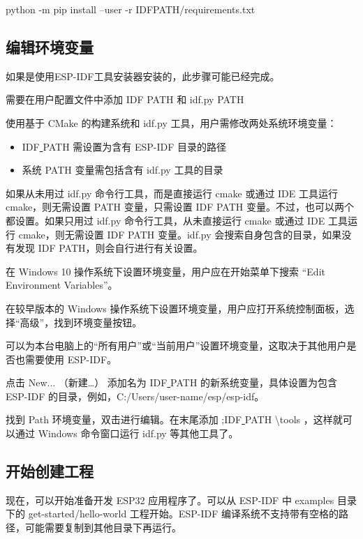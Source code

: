 \begin{tcolorbox}
    python -m pip install --user -r IDFPATH/requirements.txt
\end{tcolorbox}

\subsection{编辑环境变量}

如果是使用ESP-IDF工具安装器安装的，此步骤可能已经完成。

需要在用户配置文件中添加 IDF PATH 和 idf.py PATH

使用基于 CMake 的构建系统和 idf.py 工具，用户需修改两处系统环境变量：

\begin{itemize}
    \item IDF\underline{ }PATH 需设置为含有 ESP-IDF 目录的路径
    \item 系统 PATH 变量需包括含有 idf.py 工具的目录
\end{itemize}

如果从未用过 idf.py 命令行工具，而是直接运行 cmake 或通过 IDE 工具运行 cmake，则无需设置 PATH 变量，只需设置 IDF PATH 变量。不过，也可以两个都设置。如果只用过 idf.py 命令行工具，从未直接运行 cmake 或通过 IDE 工具运行 cmake，则无需设置 IDF PATH 变量。idf.py 会搜索自身包含的目录，如果没有发现 IDF PATH，则会自行进行有关设置。

在 Windows 10 操作系统下设置环境变量，用户应在开始菜单下搜索 “Edit Environment Variables”。

在较早版本的 Windows 操作系统下设置环境变量，用户应打开系统控制面板，选择“高级”，找到环境变量按钮。

可以为本台电脑上的“所有用户”或“当前用户”设置环境变量，这取决于其他用户是否也需要使用 ESP-IDF。

点击 New... （新建…） 添加名为 IDF\underline{ }PATH 的新系统变量，具体设置为包含 ESP-IDF 的目录，例如，C:/Users/user-name/esp/esp-idf。

找到 Path 环境变量，双击进行编辑。在末尾添加 ;IDF\underline{ }PATH \backslash tools ，这样就可以通过 Windows 命令窗口运行 idf.py 等其他工具了。

\subsection{开始创建工程}

现在，可以开始准备开发 ESP32 应用程序了。可以从 ESP-IDF 中 examples 目录下的 get-started/hello-world 工程开始。ESP-IDF 编译系统不支持带有空格的路径，可能需要复制到其他目录下再运行。

